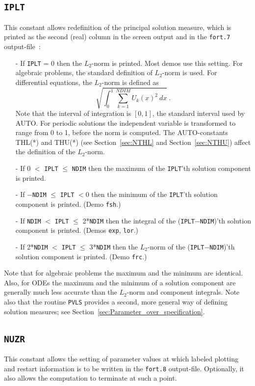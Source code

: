 \documentclass[12pt]{report}
\begin{document}
\subsection{\tt IPLT}  \label{sec:IPLT}
 This constant allows redefinition of the principal solution measure, which is
 printed as the second (real) column in the screen output and in the {\tt fort.7}
 output-file~:
 
\begin{itemize}
\item[-]
  If {\tt IPLT} = 0 then the $L_2$-norm is printed. Most demos use this setting.
  For algebraic problems, the standard definition of $L_2$-norm is used.
  For differential equations, the $L_2$-norm is defined as 
  $$ \sqrt{ \int_0^1 \sum_{k=1}^{NDIM} U_k(x)^2 ~ dx}~.$$
  Note that the interval of integration is $[0,1]$, the standard interval
 used by AUTO. For periodic solutions the independent variable is transformed
 to range from 0 to 1, before the norm is computed. The AUTO-constants THL(*) 
 and THU(*) (see Section~\ref{sec:NTHL} and Section~\ref{sec:NTHU})
 affect the definition of the $L_2$-norm.
\item[-]
  If 0 $<$ {\tt IPLT} $\le$ {\tt NDIM} then the maximum of the {\tt IPLT}'th solution component 
  is printed.
\item[-]
  If $-${\tt NDIM} $\le$ {\tt IPLT} $<$0 then the minimum of the {\tt IPLT}'th solution component
  is printed.  (Demo {\tt fsh}.)
\item[-]
  If {\tt NDIM} $<$ {\tt IPLT} $\le$ 2*{\tt NDIM} then the integral 
  of the ({\tt IPLT}$-${\tt NDIM})'th 
  solution component is printed. (Demos {\tt exp}, {\tt lor}.)
\item[-]
  If 2*{\tt NDIM} $<$ {\tt IPLT} $\le$ 3*{\tt NDIM} 
  then the $L_2$-norm of the ({\tt IPLT}$-${\tt NDIM})'th 
  solution component is printed. (Demo {\tt frc}.)
\end{itemize}

Note that for algebraic problems the maximum and the minimum are identical.
Also, for ODEs the maximum and the minimum of a solution component are generally
much less accurate than the $L_2$-norm and component integrals.
Note also that the routine {\tt PVLS} provides a second, more general way
of defining solution measures; see Section~\ref{sec:Parameter_over_specification}.


\subsection{\tt NUZR} \label{sec:NUZR} 
 This constant allows the setting of parameter values at which labeled plotting 
 and restart information is to be written in the {\tt fort.8} output-file.
 Optionally, it also allows the computation to terminate at such a point.
\end{document}
